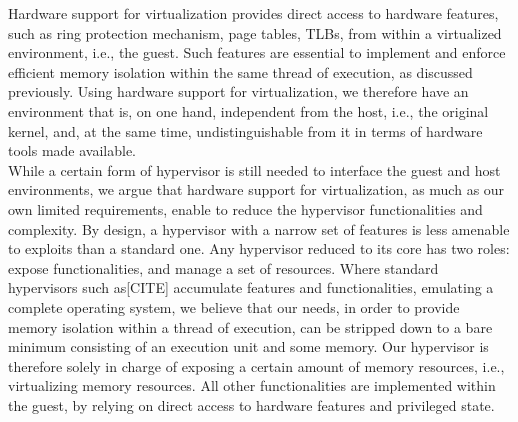 \documentclass[letterpaper,twocolumn,10pt]{article}
\begin{document}
Hardware support for virtualization provides direct access to hardware features, such as ring protection mechanism, page tables, TLBs, from within a virtualized environment, i.e., the guest.
Such features are essential to implement and enforce efficient memory isolation within the same thread of execution, as discussed previously.
Using hardware support for virtualization, we therefore have an environment that is, on one hand, independent from the host, i.e., the original kernel, and, at the same time, undistinguishable from it in terms of hardware tools made available. \\

While a certain form of hypervisor is still needed to interface the guest and host environments, we argue that hardware support for virtualization, as much as our own limited requirements, enable to reduce the hypervisor functionalities and complexity.
By design, a hypervisor with a narrow set of features is less amenable to exploits than a standard one.
Any hypervisor reduced to its core has two roles: expose functionalities, and manage a set of resources.
Where standard hypervisors such as[CITE] accumulate features and functionalities, emulating a complete operating system, we believe that our needs, in order to provide memory isolation within a thread of execution, can be stripped down to a bare minimum consisting of an execution unit and some memory.
Our hypervisor is therefore solely in charge of exposing a certain amount of memory resources, i.e., virtualizing memory resources.
All other functionalities are implemented within the guest, by relying on direct access to hardware features and privileged state. \\

\end{document}
